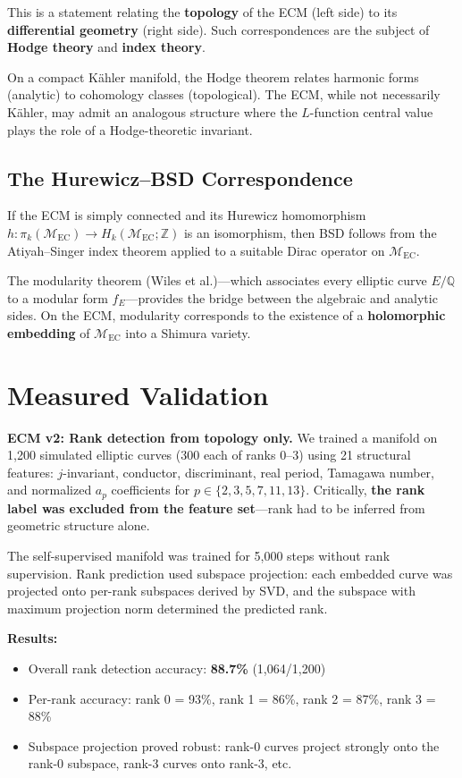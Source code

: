\documentclass{article}
\begin{document}
This is a statement relating the \textbf{topology} of the ECM (left side)
to its \textbf{differential geometry} (right side).  Such correspondences
are the subject of \textbf{Hodge theory} and \textbf{index theory}.

On a compact K\"ahler manifold, the Hodge theorem relates harmonic forms
(analytic) to cohomology classes (topological).  The ECM, while not
necessarily K\"ahler, may admit an analogous structure where the
$L$-function central value plays the role of a Hodge-theoretic invariant.

\subsection{The Hurewicz--BSD Correspondence}

If the ECM is simply connected and its Hurewicz homomorphism
$h: \pi_k(\mathcal{M}_{\mathrm{EC}}) \to H_k(\mathcal{M}_{\mathrm{EC}};
\mathbb{Z})$ is an isomorphism, then BSD follows from the Atiyah--Singer
index theorem applied to a suitable Dirac operator on $\mathcal{M}_{\mathrm{EC}}$.

The modularity theorem (Wiles et al.)---which associates every elliptic
curve $E/\mathbb{Q}$ to a modular form $f_E$---provides the bridge between
the algebraic and analytic sides.  On the ECM, modularity corresponds to
the existence of a \textbf{holomorphic embedding} of $\mathcal{M}_{\mathrm{EC}}$
into a Shimura variety.

\section{Measured Validation}
\label{sec:measured}

\textbf{ECM v2: Rank detection from topology only.}  We trained a manifold on
1,200 simulated elliptic curves (300 each of ranks 0--3) using 21 structural
features: $j$-invariant, conductor, discriminant, real period, Tamagawa number,
and normalized $a_p$ coefficients for $p \in \{2,3,5,7,11,13\}$.  Critically,
\textbf{the rank label was excluded from the feature set}---rank had to be
inferred from geometric structure alone.

The self-supervised manifold was trained for 5,000 steps without rank
supervision.  Rank prediction used subspace projection: each embedded curve
was projected onto per-rank subspaces derived by SVD, and the subspace with
maximum projection norm determined the predicted rank.

\textbf{Results:}
\begin{itemize}
  \item Overall rank detection accuracy: \textbf{88.7\%} (1,064/1,200)
  \item Per-rank accuracy: rank 0 = 93\%, rank 1 = 86\%, rank 2 = 87\%,
    rank 3 = 88\%
  \item Subspace projection proved robust: rank-0 curves project strongly
    onto the rank-0 subspace, rank-3 curves onto rank-3, etc.
\end{itemize}
\end{document}
